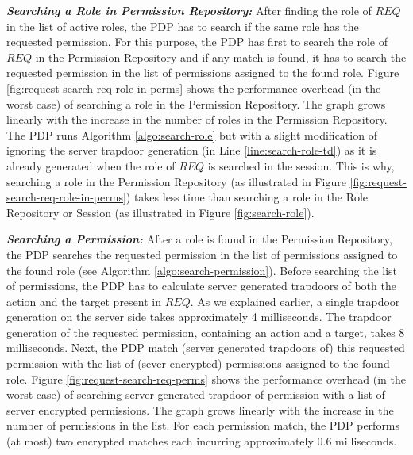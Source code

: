\documentclass[final,5p,times,twocolumn]{elsarticle}
\begin{document}
\emph{\textbf{Searching a Role in Permission Repository:}}
After finding the role of $\mathit{REQ}$ in the list of active roles, the PDP has to search if the same role has the requested permission. For this purpose, the PDP has first to search the role of $\mathit{REQ}$ in the Permission Repository and if any match is found, it has to search the requested permission in the list of permissions assigned to the found role. Figure \ref{fig:request-search-req-role-in-perms} shows the performance overhead (in the worst case) of searching a role in the Permission Repository. The graph grows linearly with the increase in the number of roles in the Permission Repository. The PDP runs Algorithm \ref{algo:search-role} but with a slight modification of ignoring the server trapdoor generation (in Line \ref{line:search-role-td}) as it is already generated when the role of $\mathit{REQ}$ is searched in the session. This is why, searching a role in the Permission Repository (as illustrated in Figure \ref{fig:request-search-req-role-in-perms}) takes less time than searching a role in the Role Repository or Session (as illustrated in Figure \ref{fig:search-role}).

\emph{\textbf{Searching a Permission:}}
After a role is found in the Permission Repository, the PDP searches the requested permission in the list of permissions assigned to the found role (see Algorithm \ref{algo:search-permission}). Before searching the list of permissions, the PDP has to calculate server generated trapdoors of both the action and the target present in $\mathit{REQ}$. As we explained earlier, a single trapdoor generation on the server side takes approximately 4 milliseconds. The trapdoor generation of the requested permission, containing an action and a target, takes 8 milliseconds. Next, the PDP match (server generated trapdoors of) this requested permission with the list of (sever encrypted) permissions assigned to the found role. Figure \ref{fig:request-search-req-perms} shows the performance overhead (in the worst case) of searching server generated trapdoor of permission with a list of server encrypted permissions. The graph grows linearly with the increase in the number of permissions in the list. For each permission match, the PDP performs (at most) two encrypted matches each incurring approximately 0.6 milliseconds.
\end{document}
